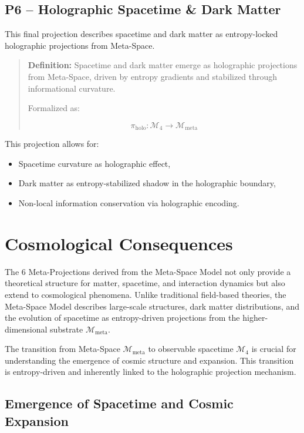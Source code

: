 \documentclass[10.5pt,a4paper]{article}
\begin{document}
\subsection{P6 – Holographic Spacetime \& Dark Matter}

This final projection describes spacetime and dark matter as entropy-locked holographic projections from Meta-Space.

\begin{quote}
\textbf{Definition:}  
Spacetime and dark matter emerge as holographic projections from Meta-Space, driven by entropy gradients 
and stabilized through informational curvature.

Formalized as:

\[
\pi_{\text{holo}}: \mathcal{M}_4 \rightarrow \mathcal{M}_{\text{meta}}
\]
\end{quote}

This projection allows for:
\begin{itemize}
    \item Spacetime curvature as holographic effect,
    \item Dark matter as entropy-stabilized shadow in the holographic boundary,
    \item Non-local information conservation via holographic encoding.
\end{itemize}

\clearpage

\section{Cosmological Consequences}

The 6 Meta-Projections derived from the Meta-Space Model not only provide a theoretical structure for matter, spacetime, and interaction dynamics but also extend to cosmological phenomena. Unlike traditional field-based theories, the Meta-Space Model describes large-scale structures, dark matter distributions, and the evolution of spacetime as entropy-driven projections from the higher-dimensional substrate \(\mathcal{M}_{\text{meta}}\).

The transition from Meta-Space \(\mathcal{M}_{\text{meta}}\) to observable spacetime \(\mathcal{M}_4\) is crucial for understanding the emergence of cosmic structure and expansion. This transition is entropy-driven and inherently linked to the holographic projection mechanism.

\subsection{Emergence of Spacetime and Cosmic Expansion}
\end{document}
